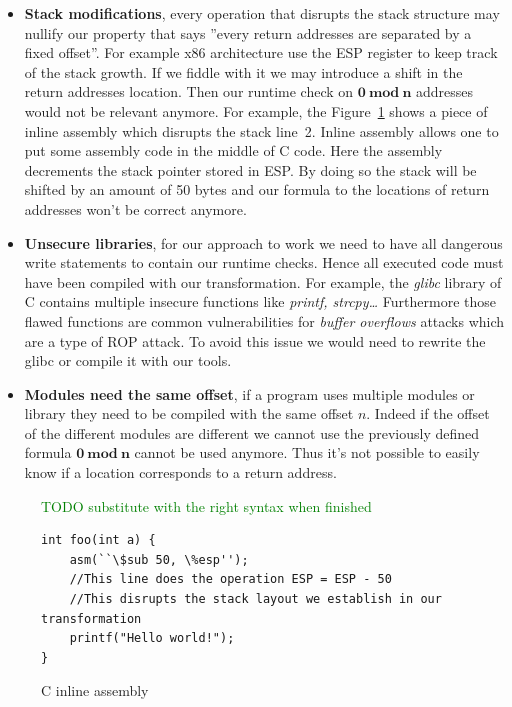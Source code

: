 \documentclass[11pt]{sdm}
\begin{document}
\begin{itemize}
	\item \textbf{Stack modifications}, every operation that disrupts the stack structure may nullify our property that says ''every return addresses are separated by a fixed offset''. For example x86 architecture use the ESP register to keep track of the stack growth. If we fiddle with it we may introduce a shift in the return addresses location. Then our runtime check on $\mathbf{0~mod~n}$ addresses would not be relevant anymore.
		For example, the Figure~\ref{inline_assembly} shows a piece of inline assembly which disrupts the stack line~2. Inline assembly allows one to put some assembly code in the middle of C code. Here the assembly decrements the stack pointer stored in ESP. By doing so the stack will be shifted by an amount of 50 bytes and our formula to the locations of return addresses won't be correct anymore.

	\item \textbf{Unsecure libraries}, for our approach to work we need to have all dangerous write statements to contain our runtime checks. Hence all executed code must have been compiled with our transformation. For example, the \textit{glibc} library of C contains multiple insecure functions like \textit{printf, strcpy\dots} Furthermore those flawed functions are common vulnerabilities for \textit{buffer overflows} attacks which are a type of ROP attack. To avoid this issue we would need to rewrite the glibc or compile it with our tools.

	\item \textbf{Modules need the same offset}, if a program uses multiple modules or library they need to be compiled with the same offset $n$. Indeed if the offset of the different modules are different we cannot use the previously defined formula $\mathbf{0~mod~n}$ cannot be used anymore. Thus it's not possible to easily know if a location corresponds to a return address.
\end{itemize}

\begin{figure}[!ht]
\textcolor{green}{TODO substitute with the right syntax when finished}
\begin{lstlisting}
int foo(int a) {
	asm(``\$sub 50, \%esp'');
	//This line does the operation ESP = ESP - 50
	//This disrupts the stack layout we establish in our transformation
	printf("Hello world!");
}
\end{lstlisting}
\centering
\caption{C inline assembly}
\label{inline_assembly}
\end{figure}
\end{document}
